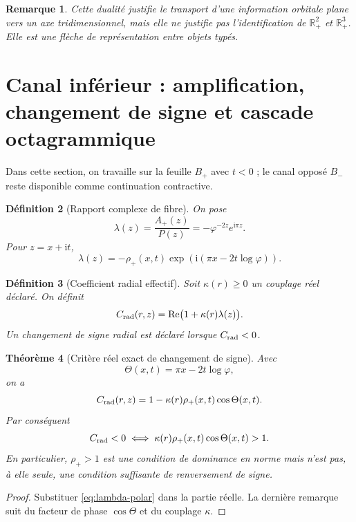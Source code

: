 \documentclass[11pt,a4paper]{article}
\newtheorem{theorem}{Théorème}[section]
\newtheorem{definition}[theorem]{Définition}
\newtheorem{remark}[theorem]{Remarque}
\newcommand{\Rp}{\mathbb R_{+}}
\newcommand{\ii}{\mathrm i}
\newcommand{\ph}{\varphi}
\newcommand{\Rea}{\operatorname{Re}}
\begin{document}
\begin{remark}
Cette dualité justifie le transport d'une information orbitale plane vers un axe tridimensionnel, mais elle ne justifie pas l'identification de $\Rp^2$ et $\Rp^3$. Elle est une flèche de représentation entre objets typés.
\end{remark}

\section{Canal inférieur : amplification, changement de signe et cascade octagrammique}

Dans cette section, on travaille sur la feuille $B_+$ avec $t<0$ ; le canal opposé $B_-$ reste disponible comme continuation contractive.

\begin{definition}[Rapport complexe de fibre]
On pose
\[
 \lambda(z)=\frac{A_+(z)}{P(z)}=-\ph^{-2z}e^{\ii\pi z}.
\]
Pour $z=x+\ii t$,
\begin{equation}\label{eq:lambda-polar}
 \lambda(z)=-\rho_+(x,t)\exp\!\left(\ii(\pi x-2t\log\ph)\right).
\end{equation}
\end{definition}

\begin{definition}[Coefficient radial effectif]
Soit $\kappa(r)\ge0$ un couplage réel déclaré. On définit
\[
 C_{\rm rad}(r,z)=\Rea\bigl(1+\kappa(r)\lambda(z)\bigr).
\]
Un changement de signe radial est déclaré lorsque $C_{\rm rad}<0$.
\end{definition}

\begin{theorem}[Critère réel exact de changement de signe]\label{thm:sign}
Avec
\[
 \Theta(x,t)=\pi x-2t\log\ph,
\]
on a
\begin{equation}\label{eq:Crad-explicit}
 C_{\rm rad}(r,z)=1-\kappa(r)\rho_+(x,t)\cos\Theta(x,t).
\end{equation}
Par conséquent
\[
 C_{\rm rad}<0
 \iff
 \kappa(r)\rho_+(x,t)\cos\Theta(x,t)>1.
\]
En particulier, $\rho_+>1$ est une condition de dominance en norme mais n'est pas, à elle seule, une condition suffisante de renversement de signe.
\end{theorem}

\begin{proof}
Substituer \eqref{eq:lambda-polar} dans la partie réelle. La dernière remarque suit du facteur de phase $\cos\Theta$ et du couplage $\kappa$.
\end{proof}
\end{document}
